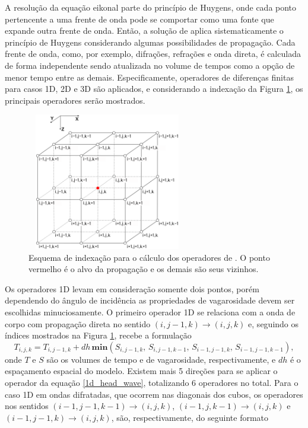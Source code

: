 A resolução da equação eikonal parte do princípio de Huygens, onde cada ponto pertencente a uma frente de onda pode se comportar como uma fonte que expande outra frente de onda. Então, a solução de  aplica sistematicamente o princípio de Huygens considerando algumas possibilidades de propagação. Cada frente de onda, como, por exemplo, difrações, refrações e onda direta, é calculada de forma independente sendo atualizada no volume de tempos como a opção de menor tempo entre as demais. Especificamente, operadores de diferenças finitas para casos 1D, 2D e 3D são aplicados, e considerando a indexação da Figura \ref{fig:voxel_full}, os principais operadores serão mostrados. 
\begin{figure}[H]
	\centering
	\includegraphics[width = 7cm, height = 6cm]{Imgs/RevisaoBibliografica/voxel_full.png}
	\caption{Esquema de indexação para o cálculo dos operadores de . O ponto vermelho é o alvo da propagação e os demais são seus vizinhos.}
	\label{fig:voxel_full}
\end{figure}
Os operadores 1D levam em consideração somente dois pontos, porém dependendo do ângulo de incidência as propriedades de vagarosidade devem ser escolhidas minuciosamente. O primeiro operador 1D se relaciona com a onda de corpo com propagação direta no sentido $(i,j-1,k) \to (i,j,k)$ e, seguindo os índices mostrados na Figura \ref{fig:voxel_full}, recebe a formulação
\begin{equation}
	T_{i,j,k} = T_{i,j-1,k} + dh\, \mathbf{min}(S_{i,j-1,k},\, S_{i,j-1,k-1},\, S_{i-1,j-1,k},\, S_{i-1,j-1,k-1}),
	\label{1d_head_wave}
\end{equation}   
\noindent onde $T$ e $S$ são os volumes de tempo e de vagarosidade, respectivamente, e $dh$ é o espaçamento espacial do modelo. Existem mais 5 direções para se aplicar o operador da equação \ref{1d_head_wave}, totalizando 6 operadores no total. Para o caso 1D em ondas difratadas, que ocorrem nas diagonais dos cubos, os operadores nos sentidos $(i-1,j-1,k-1) \to (i,j,k)$, $(i-1,j,k-1) \to (i,j,k)$ e $(i-1,j-1,k) \to (i,j,k)$, são, respectivamente, do seguinte formato
